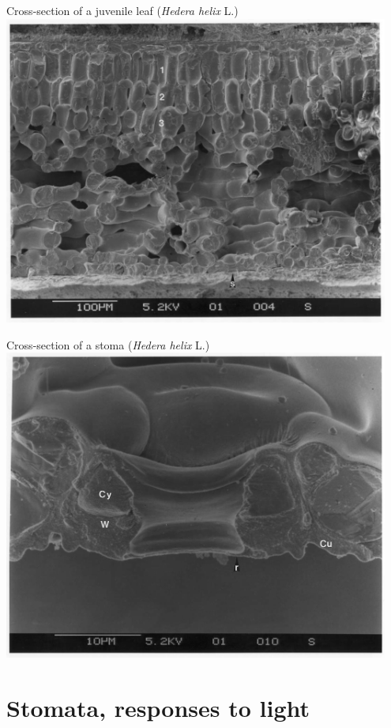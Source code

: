 \documentclass[10pt]{beamer}\usepackage[]{graphicx}\usepackage[]{color}
\begin{document}
\begin{frame}{Cross-section of a juvenile leaf (\emph{Hedera helix} L.)}
 \centering
    \includegraphics[width=0.95\textwidth]{photos/Ivy-leaf-section}
\end{frame}

\begin{frame}{Cross-section of a stoma (\emph{Hedera helix} L.)}
 \centering
    \includegraphics[width=0.95\textwidth]{photos/ivy-guard-cell-section}
\end{frame}

\section{Stomata, responses to light}
\end{document}

